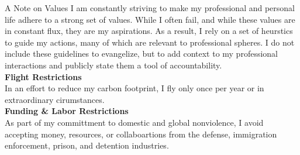 \documentclass{resume} %
\begin{document}
\vfill

\begin{rSection}{A Note on Values}
I am constantly striving to make my professional and personal life adhere to a strong set of values. While I often fail, and while these values are in constant flux, they are my aspirations. As a result, I rely on a set of heurstics to guide my actions, many of which are relevant to professional spheres. I do not include these guidelines to evangelize, but to add context to my professional interactions and publicly state them a tool of accountability. \\

{\bf Flight Restrictions} \\  
In an effort to reduce my carbon footprint, I fly only once per year or in extraordinary cirumstances. \\

{\bf Funding \& Labor Restrictions} \\
As part of my committment to domestic and global nonviolence, I avoid accepting money, resources, or collaboartions from the defense, immigration enforcement, prison, and detention industries. \\


\end{rSection}





\end{document}

